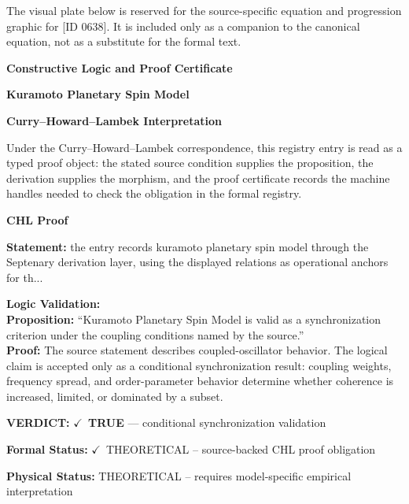 \begingroup\footnotesize\sloppy
The visual plate below is reserved for the source-specific equation and progression graphic for [ID 0638]. It is included only as a companion to the canonical equation, not as a substitute for the formal text.
\par\endgroup
\ifTZPDarkEdition
{}
\fi

\clearpage
\begingroup\tzpsupportsetup
\noindent\textbf{\fontsize{10.8pt}{12.8pt}\selectfont [ID 0638] Constructive Logic and Proof Certificate}\par
\noindent\textbf{\fontsize{10pt}{12pt}\selectfont Kuramoto Planetary Spin Model}\par
\vspace{0.45em}
\begingroup
\footnotesize
\setlength{\parskip}{0.22em}
\setlength{\parindent}{0pt}
\noindent\textbf{Curry--Howard--Lambek Interpretation}\par
Under the Curry--Howard--Lambek correspondence, this registry entry is read as a typed proof
object: the stated source condition supplies the proposition, the derivation supplies the
morphism, and the proof certificate records the machine handles needed to check the obligation
in the formal registry.

\vspace{0.45em}
\noindent\textbf{CHL Proof}\par
\textbf{Statement:} the entry records kuramoto planetary spin model through the Septenary derivation layer,
using the displayed relations as operational anchors for th...

\textbf{Logic Validation:}\\
\textbf{Proposition:} ``Kuramoto Planetary Spin Model is valid as a synchronization criterion under the coupling
conditions named by the source.''\\
\textbf{Proof:} The source statement describes coupled-oscillator behavior. The logical claim is
accepted only as a conditional synchronization result: coupling weights, frequency
spread, and order-parameter behavior determine whether coherence is increased, limited,
or dominated by a subset.

\textbf{VERDICT:} \ensuremath{\checkmark}\ \textbf{TRUE} --- conditional synchronization validation

\textbf{Formal Status:} \ensuremath{\checkmark}\ THEORETICAL -- source-backed CHL proof obligation

\textbf{Physical Status:} THEORETICAL -- requires model-specific empirical interpretation
\par\vspace{0.45em}
\par
\ifTZPDarkEdition
{}
\fi
\endgroup
\endgroup
